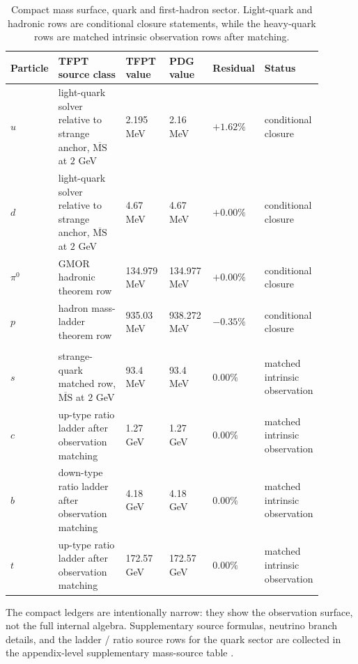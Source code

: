 \documentclass[11pt,a4paper]{article}
\theoremstyle{definition}
\theoremstyle{remark}
\begin{document}
\begin{table}[p]
\centering
\scriptsize
\setlength{\tabcolsep}{3pt}
\begin{tabularx}{\linewidth}{@{}>{\raggedright\arraybackslash}p{0.10\linewidth}>{\raggedright\arraybackslash}p{0.27\linewidth}>{\raggedleft\arraybackslash}p{0.15\linewidth}>{\raggedleft\arraybackslash}p{0.15\linewidth}>{\raggedleft\arraybackslash}p{0.10\linewidth}>{\raggedright\arraybackslash}p{0.12\linewidth}@{}}
\toprule
Particle & TFPT source class & TFPT value & PDG value & Residual & Status \\
\midrule
$u$ & light-quark solver relative to strange anchor, $\overline{\mathrm{MS}}$ at $2$ GeV & \num{2.195} MeV & \num{2.16} MeV & $+1.62\%$ & conditional closure \\
$d$ & light-quark solver relative to strange anchor, $\overline{\mathrm{MS}}$ at $2$ GeV & \num{4.67} MeV & \num{4.67} MeV & $+0.00\%$ & conditional closure \\
$\pi^0$ & GMOR hadronic theorem row & \num{134.979} MeV & \num{134.977} MeV & $+0.00\%$ & conditional closure \\
$p$ & hadron mass-ladder theorem row & \num{935.03} MeV & \num{938.272} MeV & $-0.35\%$ & conditional closure \\
\midrule
\multicolumn{6}{@{}l}{\textit{Matched intrinsic observation surface:}} \\
$s$ & strange-quark matched row, $\overline{\mathrm{MS}}$ at $2$ GeV & \num{93.4} MeV & \num{93.4} MeV & $0.00\%$ & matched intrinsic observation \\
$c$ & up-type ratio ladder after observation matching & \num{1.27} GeV & \num{1.27} GeV & $0.00\%$ & matched intrinsic observation \\
$b$ & down-type ratio ladder after observation matching & \num{4.18} GeV & \num{4.18} GeV & $0.00\%$ & matched intrinsic observation \\
$t$ & up-type ratio ladder after observation matching & \num{172.57} GeV & \num{172.57} GeV & $0.00\%$ & matched intrinsic observation \\
\bottomrule
\end{tabularx}
\caption{Compact mass surface, quark and first-hadron sector. Light-quark and hadronic rows are conditional closure statements, while the heavy-quark rows are matched intrinsic observation rows after matching.}
\label{tab:sm-mass-ledger-quarks}
\end{table}

The compact ledgers are intentionally narrow: they show the observation surface, not the full
internal algebra. Supplementary source formulas, neutrino branch details, and the ladder / ratio
source rows for the quark sector are collected in the appendix-level supplementary mass-source
table .
\end{document}
